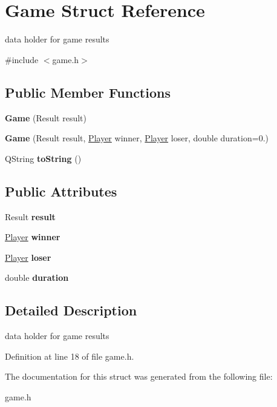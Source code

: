\hypertarget{struct_game}{\section{Game Struct Reference}
\label{struct_game}
}


data holder for game results  




{\ttfamily \#include $<$game.\-h$>$}

\subsection*{Public Member Functions}
\begin{DoxyCompactItemize}
\item 
\hypertarget{struct_game_a044fef9d8dfbbece3bafa8762991d50a}{{\bfseries Game} (Result result)}\label{struct_game_a044fef9d8dfbbece3bafa8762991d50a}

\item 
\hypertarget{struct_game_a43e6e19cc502235683d5014c78f37bbd}{{\bfseries Game} (Result result, \hyperlink{class_player}{Player} winner, \hyperlink{class_player}{Player} loser, double duration=0.)}\label{struct_game_a43e6e19cc502235683d5014c78f37bbd}

\item 
\hypertarget{struct_game_a0aa609437b4295dba61e18b7e01cc2a7}{Q\-String {\bfseries to\-String} ()}\label{struct_game_a0aa609437b4295dba61e18b7e01cc2a7}

\end{DoxyCompactItemize}
\subsection*{Public Attributes}
\begin{DoxyCompactItemize}
\item 
\hypertarget{struct_game_a9649ed9f4a7e37744396a793d345a222}{Result {\bfseries result}}\label{struct_game_a9649ed9f4a7e37744396a793d345a222}

\item 
\hypertarget{struct_game_a590df81200f797fd5bef8c5968a2ea1b}{\hyperlink{class_player}{Player} {\bfseries winner}}\label{struct_game_a590df81200f797fd5bef8c5968a2ea1b}

\item 
\hypertarget{struct_game_a151b35fd4e46d2152eb7e5d196e0b4de}{\hyperlink{class_player}{Player} {\bfseries loser}}\label{struct_game_a151b35fd4e46d2152eb7e5d196e0b4de}

\item 
\hypertarget{struct_game_a5ec0d2343999d0f1f2f1ec20a24c343b}{double {\bfseries duration}}\label{struct_game_a5ec0d2343999d0f1f2f1ec20a24c343b}

\end{DoxyCompactItemize}


\subsection{Detailed Description}
data holder for game results 

Definition at line 18 of file game.\-h.



The documentation for this struct was generated from the following file\-:\begin{DoxyCompactItemize}
\item 
game.\-h\end{DoxyCompactItemize}
